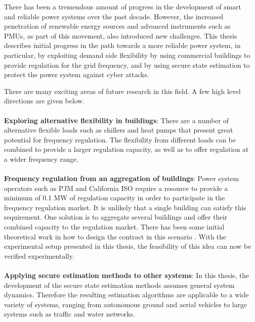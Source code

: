 \documentclass[../thesis.tex]{subfiles}
\begin{document}
There has been a tremendous amount of progress in the development of smart and reliable power systems over the past decade. 
However, the increased penetration of renewable energy sources and advanced instruments such as PMUs, as part of this movement, also introduced new challenges. 
This thesis describes initial progress in the path towards a more reliable power system, in particular, by exploiting demand side flexibility by using commercial buildings to provide regulation for the grid frequency, and by using secure state estimation to protect the power system against cyber attacks.

There are many exciting areas of future research in this field. A few high level directions are given below.\\
\\
\textbf{Exploring alternative flexibility in buildings}: %
There are a number of alternative flexible loads such as chillers and heat pumps that present great potential for frequency regulation. The flexibility from different loads can be combined to provide a larger regulation capacity, as well as to offer regulation at a wider frequency range. \\
\\
\textbf{Frequency regulation from an aggregation of buildings}: Power system operators such as PJM and California ISO require a resource to provide a minimum of 0.1 MW of regulation capacity in order to participate in the frequency regulation market. It is unlikely that a single building can satisfy this requirement. One solution is to aggregate several buildings and offer their combined capacity to the regulation market. There has been some initial theoretical work in how to design the contract in this scenario \cite{Balandat:2014contractdesign}. With the experimental setup presented in this thesis, the feasibility of this idea can now be verified experimentally.\\
\\
\textbf{Applying secure estimation methods to other systems}: In this thesis, the development of the secure state estimation methods assumes general system dynamics. Therefore the resulting estimation algorithms are applicable to a wide variety of systems, ranging from autonomous ground and aerial vehicles to large systems such as traffic and water networks.\\
\end{document}
